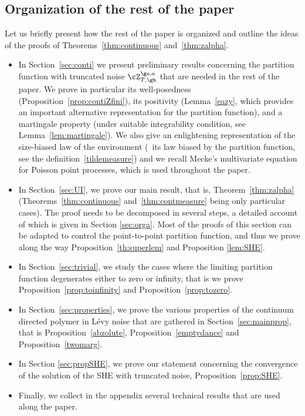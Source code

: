 \subsection{Organization of the rest of the paper}

Let us briefly present how the rest of the paper is organized and outline the ideas of the proofs of Theorems~\ref{thm:continuous}
and~\ref{thm:zalpha}.

\begin{itemize}
\item
In Section~\ref{sec:conti} we present preliminary
results concerning the partition function with truncated noise $\cZ_{T,\gb}^{\go,a}$ that are needed in the rest of the paper.
We prove in particular its well-posedness (Proposition~\ref{prop:contiZfini}), its positivity (Lemma~\ref{eazy}, which provides an important alternative representation for the partition function),
and a martingale property (under suitable integrability condition, see Lemma~\ref{lem:martingale}).
We also give an enlightening representation of
the size-biased law of the environment (\ie \ its law biased by the partition function, see the definition~\eqref{tildemeasure})
and we recall Mecke's multivariate equation for Poisson point processes, which is used throughout the paper.

\item
In Section~\ref{sec:UI}, we prove our main result, that is, Theorem~\ref{thm:zalpha}
(Theorems~\ref{thm:continuous} and~\ref{thm:contmeasure} being only particular cases).
The proof needs to be decomposed in several steps, a detailed account of which is given in Section \ref{sec:orga}. Most of the proofs of this section can be adapted to control the point-to-point
partition function, and thus we prove along the way Proposition~\ref{th:superlem} and Proposition \ref{lem:SHE}.

\item
In Section~\ref{sec:trivial}, we study the cases where the limiting partition function degenerates either to zero or infinity, that is we prove Proposition~\ref{prop:toinfinity} and
Proposition~\ref{prop:tozero}.

\item
In Section~\ref{sec:properties}, we prove the various properties of the continuum directed polymer in Lévy noise
that are gathered in Section~\ref{sec:mainprop},
that is
Proposition~\ref{abzolute},
Proposition~\ref{emptydance}
and
Proposition~\ref{twomarg}.

\item
In Section \ref{sec:propSHE},
we prove our statement concerning the convergence of the solution of the SHE with truncated noise, Proposition~\ref{prop:SHE}.

\item
Finally, we collect in the appendix several technical results that are used along the paper.
\end{itemize}

